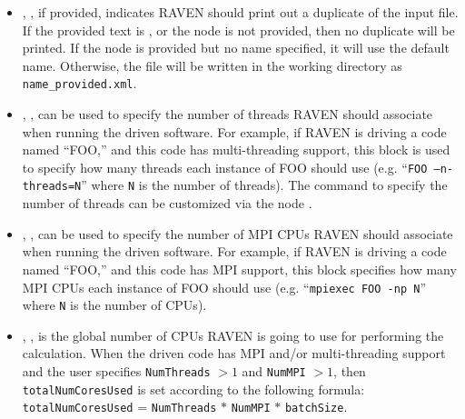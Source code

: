 \begin{itemize}
\item {}, , if provided, indicates RAVEN should print out a
  duplicate of the input file.  If the provided text is , or the node is not provided, then
  no duplicate will be printed.  If the node is provided but no name specified, it will use the default name.
  Otherwise, the file will be written in the working directory as \texttt{name\_provided.xml}.
%

\item {}, , can be used to
specify the number of threads RAVEN should associate when running the driven
software.
%
For example, if RAVEN is driving a code named ``FOO,'' and this code has
multi-threading support, this block is used to specify how many threads each
instance of FOO should use (e.g. ``\texttt{FOO --n-threads=N}'' where \texttt{N}
 is the number of threads). The command to specify the number of threads can be
customized via the node .
%

\item {}, , can be used to
specify the number of MPI CPUs RAVEN should associate when running the driven
software.
%
For example, if RAVEN is driving a code named ``FOO,'' and this code has MPI
support, this block specifies how many MPI CPUs each instance of FOO should use
(e.g. ``\texttt{mpiexec FOO -np N}'' where \texttt{N} is the number of CPUs).
%

\item {}, , is the
global number of CPUs RAVEN is going to use for performing the calculation.
%
When the driven code has MPI and/or multi-threading support and the user
specifies \texttt{NumThreads} $> 1$  and \texttt{NumMPI} $> 1$, then
\texttt{totalNumCoresUsed} is set according to the following formula:\\
\texttt{totalNumCoresUsed} = \texttt{NumThreads} $*$ \texttt{NumMPI} $*$
\texttt{batchSize}.
%


\end{itemize}
